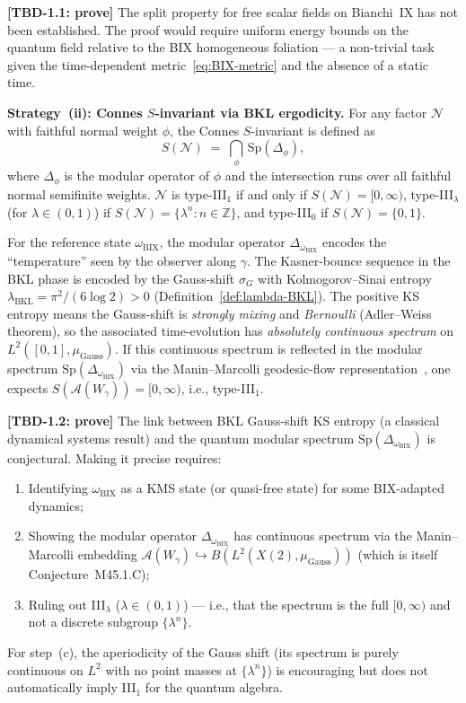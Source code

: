 \documentclass[12pt,a4paper]{article}
\begin{document}
\noindent\textbf{[TBD-1.1: prove]} The split property for free
scalar fields on Bianchi~IX has not been established.
The proof would require uniform energy bounds on the quantum field
relative to the BIX homogeneous foliation ---
a non-trivial task given the time-dependent metric~\eqref{eq:BIX-metric}
and the absence of a static time.

\vspace{4pt}
\noindent\textbf{Strategy~(ii): Connes $S$-invariant via BKL ergodicity.}
For any factor $\mathcal{N}$ with faithful normal weight $\phi$,
the Connes $S$-invariant is defined as
\begin{equation}
  S(\mathcal{N}) \;=\; \bigcap_{\phi}\,
  \mathrm{Sp}(\Delta_\phi),
  \label{eq:S-invariant}
\end{equation}
where $\Delta_\phi$ is the modular operator of $\phi$ and
the intersection runs over all faithful normal semifinite weights.
$\mathcal{N}$ is type-III$_1$ if and only if $S(\mathcal{N})=[0,\infty)$,
type-III$_\lambda$ (for $\lambda\in(0,1)$) if $S(\mathcal{N})=
\{\lambda^n:n\in\mathbb{Z}\}$, and type-III$_0$ if $S(\mathcal{N})=\{0,1\}$.

For the reference state $\omega_{\mathrm{BIX}}$,
the modular operator $\Delta_{\omega_{\mathrm{BIX}}}$ encodes the
``temperature'' seen by the observer along $\gamma$.
The Kasner-bounce sequence in the BKL phase is encoded by the
Gauss-shift $\sigma_G$ with Kolmogorov--Sinai entropy
$\lambda_{\mathrm{BKL}} = \pi^2/(6\log 2) > 0$
(Definition~\ref{def:lambda-BKL}).
The positive KS entropy means the Gauss-shift is
\emph{strongly mixing} and \emph{Bernoulli} (Adler--Weiss theorem),
so the associated time-evolution has \emph{absolutely continuous
spectrum} on $L^2([0,1],\mu_{\mathrm{Gauss}})$.
If this continuous spectrum is reflected in the modular spectrum
$\mathrm{Sp}(\Delta_{\omega_{\mathrm{BIX}}})$
via the Manin--Marcolli geodesic-flow representation~\cite{ManinMarcolli2015},
one expects $S(\mathcal{A}(W_\gamma))=[0,\infty)$, i.e., type-III$_1$.

\noindent\textbf{[TBD-1.2: prove]} The link between BKL Gauss-shift KS entropy
(a classical dynamical systems result) and the quantum modular spectrum
$\mathrm{Sp}(\Delta_{\omega_{\mathrm{BIX}}})$ is conjectural.
Making it precise requires:
\begin{enumerate}
  \item[(a)] Identifying $\omega_{\mathrm{BIX}}$ as a KMS state
     (or quasi-free state) for some BIX-adapted dynamics;
  \item[(b)] Showing the modular operator $\Delta_{\omega_{\mathrm{BIX}}}$
     has continuous spectrum via the Manin--Marcolli embedding
     $\mathcal{A}(W_\gamma)\hookrightarrow
     B(L^2(X(2),\mu_{\mathrm{Gauss}}))$
     (which is itself Conjecture~M45.1.C);
  \item[(c)] Ruling out III$_\lambda$ ($\lambda\in(0,1)$) ---
     i.e., that the spectrum is the full $[0,\infty)$ and not
     a discrete subgroup $\{\lambda^n\}$.
\end{enumerate}
For step~(c), the aperiodicity of the Gauss shift (its spectrum is purely
continuous on $L^2$ with no point masses at $\{\lambda^n\}$) is encouraging
but does not automatically imply III$_1$ for the quantum algebra.
\end{document}
